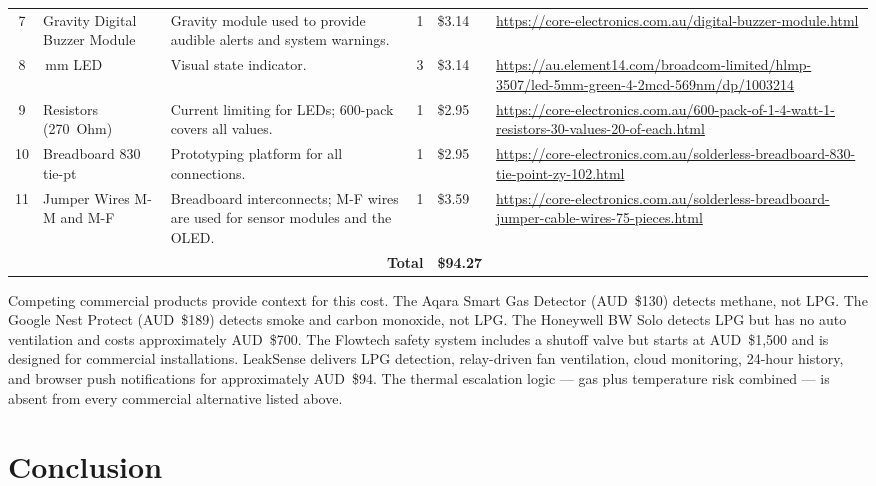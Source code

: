 \documentclass[a4paper,10pt,conference,onecolumn]{IEEEtran}
\begin{document}
\begin{table}[H]
\begin{tabularx}{\linewidth}{c
  >{\raggedright\arraybackslash}p{1.8cm}
  >{\raggedright\arraybackslash}X
  c
  >{\raggedleft\arraybackslash}p{0.8cm}
  >{\raggedright\arraybackslash}p{6.2cm}}
7 & Gravity Digital Buzzer Module & Gravity module used to provide audible
alerts and system warnings. & 1 & \$3.14 &
\url{https://core-electronics.com.au/digital-buzzer-module.html} \\
8 & 5\,mm LED & Visual state indicator. & 3 & \$3.14 &
\url{https://au.element14.com/broadcom-limited/hlmp-3507/led-5mm-green-4-2mcd-569nm/dp/1003214} \\
9 & Resistors (270~Ohm) & Current limiting for LEDs; 600-pack covers all
values. & 1 & \$2.95 &
\url{https://core-electronics.com.au/600-pack-of-1-4-watt-1-resistors-30-values-20-of-each.html} \\
10 & Breadboard 830 tie-pt & Prototyping platform for all connections. & 1 &
\$2.95 &
\url{https://core-electronics.com.au/solderless-breadboard-830-tie-point-zy-102.html} \\
11 & Jumper Wires M-M and M-F & Breadboard interconnects; M-F wires are used
for sensor modules and the OLED. & 1 & \$3.59 &
\url{https://core-electronics.com.au/solderless-breadboard-jumper-cable-wires-75-pieces.html} \\
\midrule
\multicolumn{4}{r}{\textbf{Total}} & \textbf{\$94.27} & \\
\bottomrule
\end{tabularx}
\end{table}

Competing commercial products provide context for this cost. The Aqara Smart
Gas Detector (AUD~\$130) detects methane, not LPG. The Google Nest Protect
(AUD~\$189) detects smoke and carbon monoxide, not LPG. The Honeywell BW
Solo detects LPG but has no auto ventilation and costs approximately
AUD~\$700. The Flowtech safety system includes a shutoff valve but starts at
AUD~\$1,500 and is designed for commercial installations. LeakSense delivers
LPG detection, relay-driven fan ventilation, cloud monitoring, 24-hour
history, and browser push notifications for approximately AUD~\$94. The thermal escalation
logic --- gas plus temperature risk combined --- is absent from every
commercial alternative listed above.

\section{Conclusion}
\label{sec:conclusion}
\end{document}
